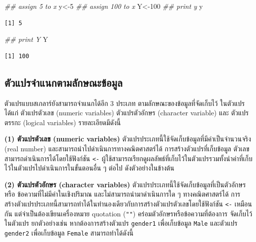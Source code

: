 \documentclass[
  a4paper,
]{book}
\newenvironment{Shaded}{\begin{snugshade}}{\end{snugshade}}
\newcommand{\DecValTok}[1]{\textcolor[rgb]{0.68,0.00,0.00}{#1}}
\newcommand{\DocumentationTok}[1]{\textcolor[rgb]{0.37,0.37,0.37}{\textit{#1}}}
\newcommand{\NormalTok}[1]{\textcolor[rgb]{0.00,0.23,0.31}{#1}}
\newcommand{\OtherTok}[1]{\textcolor[rgb]{0.00,0.23,0.31}{#1}}
\begin{document}
\begin{Shaded}
\begin{Highlighting}[]
\DocumentationTok{\#\# assign 5 to x}
\NormalTok{y}\OtherTok{\textless{}{-}}\DecValTok{5} 
\DocumentationTok{\#\# assign 100 to x}
\NormalTok{Y}\OtherTok{\textless{}{-}}\DecValTok{100} 
\DocumentationTok{\#\# print y}
\NormalTok{y}
\end{Highlighting}
\end{Shaded}

\begin{verbatim}
[1] 5
\end{verbatim}

\begin{Shaded}
\begin{Highlighting}[]
\DocumentationTok{\#\# print Y}
\NormalTok{Y }
\end{Highlighting}
\end{Shaded}

\begin{verbatim}
[1] 100
\end{verbatim}

\subsection{ตัวแปรจำแนกตามลักษณะข้อมูล}\label{uxe15uxe27uxe41uxe1buxe23uxe08uxe33uxe41uxe19uxe01uxe15uxe32uxe21uxe25uxe01uxe29uxe13uxe30uxe02uxe2duxe21uxe25}

ตัวแปรแบบสเกลาร์ยังสามารถจำแนกได้อีก 3 ประเภท ตามลักษณะของข้อมูลที่จัดเก็บไว้ ในตัวแปร
ได้แก่ ตัวแปรตัวเลข (numeric variables) ตัวแปรตัวอักษร (character variable) และ
ตัวแปรตรรกะ (logical variables) รายละเอียดมีดังนี้

\textbf{(1) ตัวแปรตัวเลข (numeric variables)}
ตัวแปรประเภทนี้ใช้จัดเก็บข้อมูลที่มีค่าเป็นจำนวนจริง (real number)
และสามารถนำไปดำเนินการทางคณิตศาสตร์ได้ การสร้างตัวแปรที่เก็บข้อมูล
ตัวเลขสามารถดำเนินการได้โดยใช้ฟังก์ชัน \texttt{\textless{}-}
ผู้ใช้สามารถเรียกดูผลลัพธ์ที่เก็บไว้ในตัวแปรรวมทั้งนำค่าที่เก็บไว้ในตัวแปรไปดำเนินการในขั้นตอนอื่น
ๆ ต่อไป ดังตัวอย่างในข้างต้น

\textbf{(2) ตัวแปรตัวอักษร (character variables)}
ตัวแปรประเภทนี้ใช้จัดเก็บข้อมูลที่เป็นตัวอักษรหรือ ข้อความที่ไม่มีค่าในเชิงปริมาณ
และไม่สามารถนำมาดำเนินการใด ๆ ทางคณิตศาสตร์ได้ การ
สร้างตัวแปรประเภทนี้สามารถทำได้ในทำนองเดียวกับการสร้างตัวแปรตัวเลขโดยใช้ฟังก์ชัน
\texttt{\textless{}-} เหมือนกัน แต่จำเป็นต้องเขียนเครื่องหมาย quotation
(\texttt{""}) คร่อมตัวอักษรหรือข้อความที่ต้องการ จัดเก็บไว้ในตัวแปร ยกตัวอย่างเช่น
หากต้องการสร้างตัวแปร \texttt{gender1} เพื่อเก็บข้อมูล \texttt{Male} และตัวแปร
\texttt{gender2} เพื่อเก็บข้อมูล \texttt{Female} สามารถทำได้ดังนี้
\end{document}

